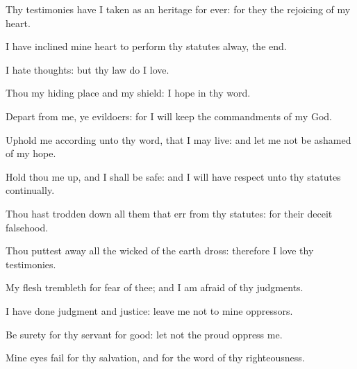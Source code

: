 {\Q {}Thy
testimonies have I taken as an
heritage for
ever: for they
{} the
rejoicing of my
heart.


\par }{\Q {}I have
inclined mine
heart to
perform thy
statutes
alway,
{} the
end.


\par }{
\par }
{\Q {}I
hate
{}
thoughts: but thy
law do I
love.


\par }{\Q {}Thou
{} my hiding
place and my
shield: I
hope in thy
word.


\par }{\Q {}Depart from me, ye
evildoers: for I will
keep the
commandments of my
God.


\par }{\BB \par }
{\Q {}Uphold me according unto thy
word, that I may
live: and let me not be
ashamed of my
hope.


\par }{\Q {}Hold thou me
up, and I shall be
safe: and I will have
respect unto thy
statutes
continually.


\par }{\BB \par }
{\Q {}Thou hast trodden
down all them that
err from thy
statutes: for their
deceit
{}
falsehood.


\par }{\Q {}Thou puttest
away all the
wicked of the
earth
{}
dross: therefore I
love thy
testimonies.


\par }{\Q {}My
flesh
trembleth for
fear of thee; and I am
afraid of thy
judgments.


\par }{\BB \par }
{
\par }
{\Q {}I have
done
judgment and
justice:
leave me not to mine
oppressors.


\par }{\Q {}Be
surety for thy
servant for
good: let not the
proud
oppress me.


\par }{\Q {}Mine
eyes
fail for thy
salvation, and for the
word of thy
righteousness.


\par }{\BB \par }
